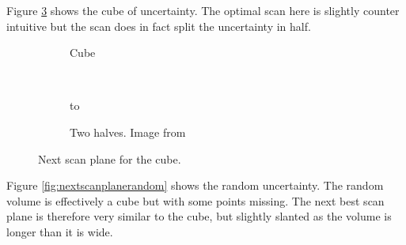 Figure \ref{fig:nextscanplanecube} shows the cube of uncertainty. The optimal scan here is slightly counter intuitive but the scan does in fact split the uncertainty in half.

\begin{figure}[H]
  \centering
  \begin{subfigure}[b]{0.4\textwidth}
    \usebox{\mybox}
    \caption{Cube}
    \label{fig:nextscanplanecube}  
  \end{subfigure}%
  ~ %
  \begin{subfigure}[b]{0.4\textwidth}
    \vbox to \ht{}
    \caption{Two halves. Image from \cite{cuttingupcubes}}
    \label{fig:nextscanplanecubecut}  
  \end{subfigure}  
  \caption{Next scan plane for the cube.}\label{fig:nextscanplanecube}
\end{figure}

Figure \ref{fig:nextscanplanerandom} shows the random uncertainty. The random volume is effectively a cube but with some points missing. The next best scan plane is therefore very similar to the cube, but slightly slanted as the volume is longer than it is wide.

